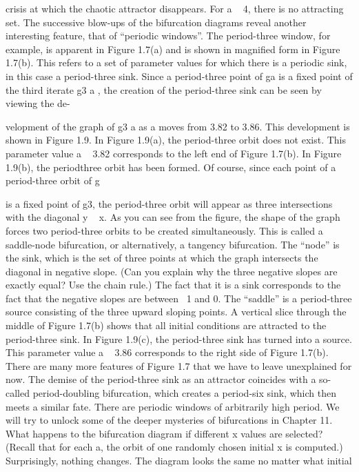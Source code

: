 \documentclass{article}
\begin{document}
crisis at which the chaotic attractor disappears. For a   4, there is no attracting
set.
The successive blow-ups of the bifurcation diagrams reveal another interesting
feature, that of “periodic windows”. The period-three window, for example,
is apparent in Figure 1.7(a) and is shown in magnified form in Figure 1.7(b). This
refers to a set of parameter values for which there is a periodic sink, in this case
a period-three sink. Since a period-three point of ga is a fixed point of the third
iterate g3
a , the creation of the period-three sink can be seen by viewing the de-

velopment of the graph of g3
a as a moves from 3.82 to 3.86. This development is
shown in Figure 1.9.
In Figure 1.9(a), the period-three orbit does not exist. This parameter value
a   3.82 corresponds to the left end of Figure 1.7(b). In Figure 1.9(b), the periodthree
orbit has been formed. Of course, since each point of a period-three orbit of g

is a fixed point of g3, the period-three orbit will appear as three intersections with
the diagonal y   x. As you can see from the figure, the shape of the graph forces
two period-three orbits to be created simultaneously. This is called a saddle-node
bifurcation, or alternatively, a tangency bifurcation. The “node” is the sink, which
is the set of three points at which the graph intersects the diagonal in negative
slope. (Can you explain why the three negative slopes are exactly equal? Use the
chain rule.) The fact that it is a sink corresponds to the fact that the negative
slopes are between  1 and 0. The “saddle” is a period-three source consisting of
the three upward sloping points. A vertical slice through the middle of Figure
1.7(b) shows that all initial conditions are attracted to the period-three sink.
In Figure 1.9(c), the period-three sink has turned into a source. This parameter
value a   3.86 corresponds to the right side of Figure 1.7(b).
There are many more features of Figure 1.7 that we have to leave unexplained
for now. The demise of the period-three sink as an attractor coincides with
a so-called period-doubling bifurcation, which creates a period-six sink, which
then meets a similar fate. There are periodic windows of arbitrarily high period.
We will try to unlock some of the deeper mysteries of bifurcations in Chapter 11.
What happens to the bifurcation diagram if different x values are selected?
(Recall that for each a, the orbit of one randomly chosen initial x is computed.)
Surprisingly, nothing changes. The diagram looks the same no matter what initial
\end{document}
